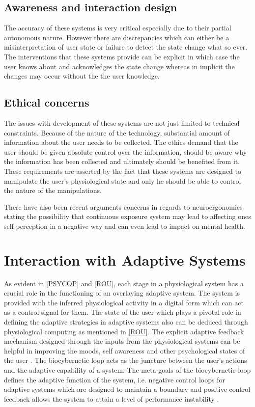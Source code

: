 \documentclass[10pt,a4paper]{article}
\begin{document}
\subsection{Awareness and interaction design}
The accuracy of these systems is very critical especially due to their partial autonomous nature. However there are discrepancies which can either be a misinterpretation of user state or failure to detect the state change what so ever. The interventions that these systems provide can be explicit in which case the user knows about and acknowledges the state change whereas in implicit the changes may occur without the the user knowledge.

\subsection{Ethical concerns}
The issues with development of these systems are not just limited to technical constraints. Because of the nature of the technology, substantial amount of information about the user needs to be collected. The ethics demand that the user should be given absolute control over the information\cite{PIKL:2002:IWC}, should be aware why the information has been collected \cite{KELLY:2006:WEB} and ultimately should be benefited from it. These requirements are asserted by the fact that these systems are designed to manipulate the user's physiological state and only he should be able to control the nature of the manipulations. 

There have also been recent arguments concerns in regards to neuroergonomics stating the possibility that continuous exposure system may lead to affecting ones self perception in a negative way \cite{HS:2003:TIES} and can even lead to impact on mental health.

\section{Interaction with Adaptive Systems}
As evident in \ref{PSYCOP} and \ref{ROU}, each stage in a physiological system has a crucial role in the functioning of an overlaying adaptive system. The system is provided with the inferred physiological activity in a digital form which can act as a control signal for them. The state of the user which plays a pivotal role in defining the adaptive strategies in adaptive systems also can be deduced through physiological computing as mentioned in \ref{ROU}. The explicit adaptive feedback mechanism designed through the inputs from the physiological systems can be helpful in improving the moods, self awareness and other psychological states of the user \cite{PIKL:2002:IWC}.
The biocybernetic loop acts as the juncture between the user's actions and the adaptive capability of a system. The meta-goals of the biocybernetic loop defines the adaptive function of the system, i.e. negative control loops for adaptive systems which are designed to maintain a boundary \cite{HKW:1989:AA} and positive control feedback allows the system to attain a level of performance instability \cite{FMPS:1999:BP}.
\end{document}
